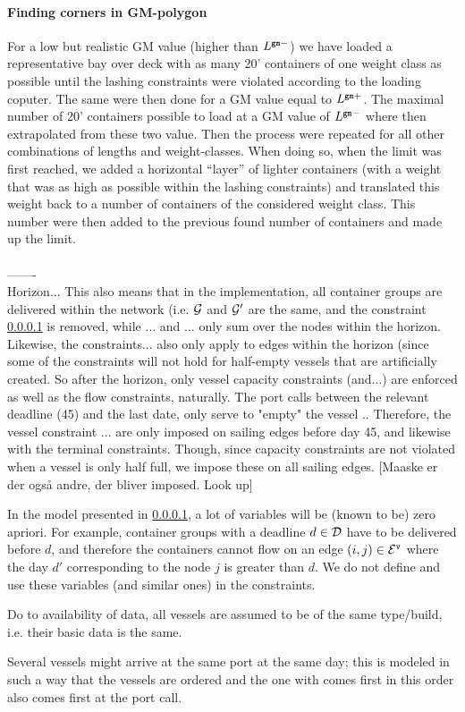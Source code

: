 \paragraph{Finding corners in GM-polygon} 
For a low but realistic GM value (higher than $L^{\texttt{gm}-}$) we have loaded a representative bay over deck with as many 20' containers of one weight class as possible until the lashing constraints were violated according to the loading coputer. The same were then done for a GM value equal to $L^{\texttt{gm}+}$. The maximal number of 20' containers possible to load at a GM value of $L^{\texttt{gm}-}$ where then extrapolated from these two value. 
Then the process were repeated for all other combinations of lengths and weight-classes.
When doing so, when the limit was first reached, we added a horizontal ``layer'' of lighter containers (with a weight that was as high as possible within the lashing constraints) and translated this weight back to a number of containers of the considered weight class. This number were then added to the previous found number of containers and made up the limit.
\\\\
-------\\
Horizon... This also means that in the implementation, all container groups are delivered within the network (i.e. $\mathcal{G}$ and $\mathcal{G}'$ are the same, and the constraint \ref{} is removed, while ... and ... only sum over the nodes within the horizon. Likewise, the constraints... also only apply to edges within the horizon (since some of the constraints will not hold for half-empty vessels that are artificially created. So after the horizon, only vessel capacity constraints (and...) are enforced as well as the flow constraints, naturally.  
The port calls between the relevant deadline (45) and the last date, only serve to "empty" the vessel .. Therefore, the vessel constraint ... are only imposed on sailing edges before day 45, and likewise with the terminal constraints. Though, since capacity constraints are not violated when a vessel is only half full, we impose these on all sailing edges. [Maaske er der også andre, der bliver imposed. Look up] 


In the model presented in \ref{}, a lot of variables will be (known to be) zero apriori. For example, container groups with a deadline $d\in\mathcal{D}$ have to be delivered before $d$, and therefore the containers cannot flow on an edge $(i,j)\in\mathcal{E}^\texttt{v}$ where the day $d'$ corresponding to the node $j$ is greater than $d$. We do not define and use these variables (and similar ones) in the constraints.

Do to availability of data, all vessels are assumed to be of the same type/build, i.e. their basic data is the same.

Several vessels might arrive at the same port at the same day; this is modeled in such a way that the vessels are ordered and the one with comes first in this order also comes first at the port call. 
